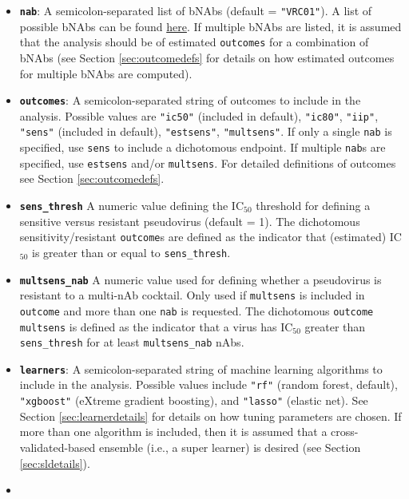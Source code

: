 \documentclass[]{article}
\providecommand{\tightlist}{%
  \setlength{\itemsep}{0pt}\setlength{\parskip}{0pt}}
\begin{document}
\begin{itemize}
\tightlist
\item
  \textbf{\texttt{nab}}: A semicolon-separated list of bNAbs (default =
  \texttt{"VRC01"}). A list of possible bNAbs can be found
  \href{https://www.hiv.lanl.gov/components/sequence/HIV/neutralization/main.comp}{here}.
  If multiple bNAbs are listed, it is assumed that the analysis should
  be of estimated \texttt{outcomes} for a combination of bNAbs (see
  Section \ref{sec:outcomedefs} for details on how estimated outcomes
  for multiple bNAbs are computed).
\item
  \textbf{\texttt{outcomes}}: A semicolon-separated string of outcomes
  to include in the analysis. Possible values are \texttt{"ic50"}
  (included in default), \texttt{"ic80"}, \texttt{"iip"},
  \texttt{"sens"} (included in default), \texttt{"estsens"},
  \texttt{"multsens"}. If only a single \texttt{nab} is specified, use
  \texttt{sens} to include a dichotomous endpoint. If multiple
  \texttt{nab}s are specified, use \texttt{estsens} and/or
  \texttt{multsens}. For detailed definitions of outcomes see Section
  \ref{sec:outcomedefs}.
\item
  \textbf{\texttt{sens\_thresh}} A numeric value defining the
  IC\(_{50}\) threshold for defining a sensitive versus resistant
  pseudovirus (default = 1). The dichotomous sensitivity/resistant
  \texttt{outcome}s are defined as the indicator that (estimated)
  IC\(_{50}\) is greater than or equal to \texttt{sens\_thresh}.
\item
  \textbf{\texttt{multsens\_nab}} A numeric value used for defining
  whether a pseudovirus is resistant to a multi-nAb cocktail. Only used
  if \texttt{multsens} is included in \texttt{outcome} and more than one
  \texttt{nab} is requested. The dichotomous \texttt{outcome}
  \texttt{multsens} is defined as the indicator that a virus has
  IC\(_{50}\) greater than \texttt{sens\_thresh} for at least
  \texttt{multsens\_nab} nAbs.
\item
  \textbf{\texttt{learners}}: A semicolon-separated string of machine
  learning algorithms to include in the analysis. Possible values
  include \texttt{"rf"} (random forest, default), \texttt{"xgboost"}
  (eXtreme gradient boosting), and \texttt{"lasso"} (elastic net). See
  Section \ref{sec:learnerdetails} for details on how tuning parameters
  are chosen. If more than one algorithm is included, then it is assumed
  that a cross-validated-based ensemble (i.e., a super learner) is
  desired (see Section \ref{sec:sldetails}).
\item

\end{itemize}
\end{document}
